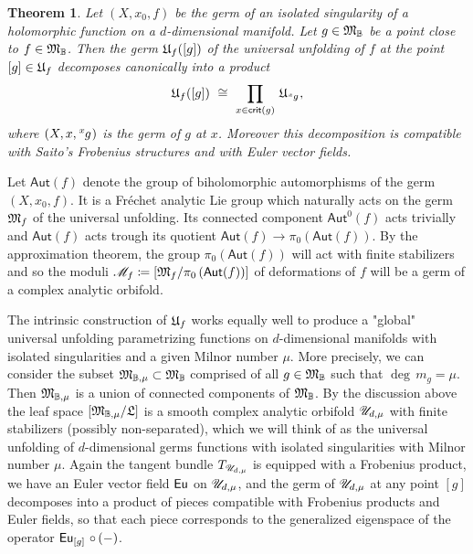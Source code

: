 \documentclass[twoside,leqno]{article}
\numberwithin{equation}{section}
\theoremstyle{plain}
\newtheorem{theorem}[equation]{Theorem}
\theoremstyle{definition}
\begin{document}
\begin{theorem} \label{theo:decompsing} 
Let $(X,x_{0},f)$ be the germ of an isolated singularity of a holomorphic function on a $d$-dimensional manifold. Let $g \in \mathfrak{M}_{\mathbb{B}}$ be a point close to $f \in \mathfrak{M}_{\mathbb{B}}$. Then the germ $\mathfrak{U}_{f}([g])$ of the universal unfolding of $f$ at the point $[g] \in \mathfrak{U}_{f}$ decomposes canonically into a product 
\[
\univ_{f}([g]) \ \cong \ \prod_{x \in \mathsf{crit}(g)} \, \univ_{{\tensor[^x]{g}{}}},
\]
where $(X,x,{\tensor[^x]{g}{}})$ is the germ of $g$ at $x$. Moreover this decomposition is compatible with Saito's Frobenius structures and with Euler vector fields.
\end{theorem}

Let $\mathsf{Aut}(f)$ denote the group of biholomorphic automorphisms of the germ $(X,x_{0},f)$. It is a Fr\'{e}chet analytic Lie group which naturally acts on the germ $\mathfrak{M}_{f}$ of the universal unfolding.  Its connected component $\mathsf{Aut}^{0}(f)$ acts 
trivially and $\mathsf{Aut}(f)$ acts trough its quotient $\mathsf{Aut}(f) \to \pi_{0}\left( 
\mathsf{Aut}(f)\right)$. By the approximation theorem, the group $\pi_{0}\left( 
\mathsf{Aut}(f)\right)$ will act with finite stabilizers and so 
the moduli $\mathscr{M}_{f} \coloneqq \left[\mathfrak{M}_{f}/\pi_{0}\left( 
\mathsf{Aut}(f)\right)\right]$ of deformations of $f$ will be a germ of a complex analytic orbifold.


The intrinsic construction of $\mathfrak{U}_{f}$ works equally well to produce a "global" universal unfolding parametrizing functions  on $d$-dimensional manifolds with isolated singularities and a given Milnor number $\mu$. More precisely, we can consider the subset  $\mathfrak{M}_{\mathbb{B},\mu} \subset \mathfrak{M}_{\mathbb{B}}$  comprised of all $g \in \mathfrak{M}_{\mathbb{B}}$ such that $\deg \, m_{g} = \mu$. Then $\mathfrak{M}_{\mathbb{B},\mu}$ is a union of connected components of 
$\mathfrak{M}_{\mathbb{B}}$. By the discussion above the leaf space $\left[\mathfrak{M}_{\mathbb{B},\mu}/\mathfrak{L}\right]$ is a smooth complex analytic orbifold $\mathscr{U}_{d,\mu}$ with finite stabilizers (possibly non-separated), which we will think of as the  universal unfolding of $d$-dimensional germs functions with isolated singularities with Milnor number $\mu$. Again the tangent bundle $T_{\mathscr{U}_{d,\mu}}$ is equipped with a Frobenius product, we have an Euler vector field $\operatorname{\mathsf{Eu}}$ on $\mathscr{U}_{d,\mu}$, and the germ of $\mathscr{U}_{d,\mu}$ at any point $[g]$ decomposes into a product of pieces compatible with Frobenius products and Euler fields, so that each piece corresponds to the generalized eigenspace of the 
operator $\operatorname{\mathsf{Eu}}_{[g]}\, \circ \, (-)$.
\end{document}
